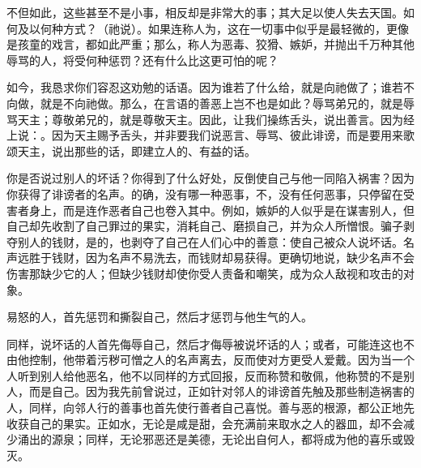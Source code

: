 不但如此，这些甚至不是小事，相反却是非常大的事；其大足以使人失去天国。如何及以何种方式？（祂说）。如果连称人为，这在一切事中似乎是最轻微的，更像是孩童的戏言，都如此严重；那么，称人为恶毒、狡猾、嫉妒，并抛出千万种其他辱骂的人，将受何种惩罚？还有什么比这更可怕的呢？\par

如今，我恳求你们容忍这劝勉的话语。因为谁若了什么给，就是向祂做了；谁若不向做，就是不向祂做。那么，在言语的善恶上岂不也是如此？辱骂弟兄的，就是辱骂天主；尊敬弟兄的，就是尊敬天主。因此，让我们操练舌头，说出善言。因为经上说：。因为天主赐予舌头，并非要我们说恶言、辱骂、彼此诽谤，而是要用来歌颂天主，说出那些的话，即建立人的、有益的话。\par

你是否说过别人的坏话？你得到了什么好处，反倒使自己与他一同陷入祸害？因为你获得了诽谤者的名声。的确，没有哪一种恶事，不，没有任何恶事，只停留在受害者身上，而是连作恶者自己也卷入其中。例如，嫉妒的人似乎是在谋害别人，但自己却先收割了自己罪过的果实，消耗自己、磨损自己，并为众人所憎恨。骗子剥夺别人的钱财，是的，也剥夺了自己在人们心中的善意：使自己被众人说坏话。名声远胜于钱财，因为名声不易洗去，而钱财却易获得。更确切地说，缺少名声不会伤害那缺少它的人；但缺少钱财却使你受人责备和嘲笑，成为众人敌视和攻击的对象。\par

易怒的人，首先惩罚和撕裂自己，然后才惩罚与他生气的人。\par

同样，说坏话的人首先侮辱自己，然后才侮辱被说坏话的人；或者，可能连这也不由他控制，他带着污秽可憎之人的名声离去，反而使对方更受人爱戴。因为当一个人听到别人给他恶名，他不以同样的方式回报，反而称赞和敬佩，他称赞的不是别人，而是自己。因为我先前曾说过，正如针对邻人的诽谤首先触及那些制造祸害的人，同样，向邻人行的善事也首先使行善者自己喜悦。善与恶的根源，都公正地先收获自己的果实。正如水，无论是咸是甜，会充满前来取水之人的器皿，却不会减少涌出的源泉；同样，无论邪恶还是美德，无论出自何人，都将成为他的喜乐或毁灭。\par

